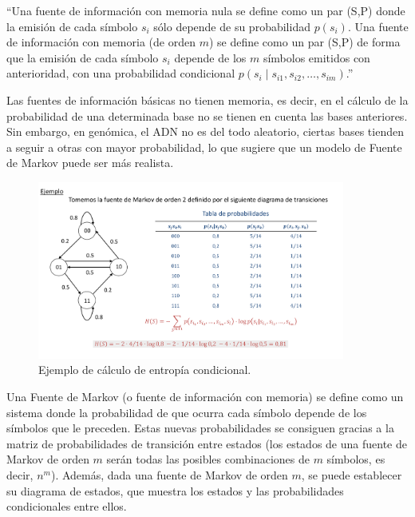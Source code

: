 \documentclass[11pt,spanish,listoffigures,listoftables]{tfgetsinf}
\begin{document}
“Una fuente de información con memoria nula se define como un par (S,P) donde la emisión de cada símbolo \( s_i \) sólo depende de su probabilidad \( p(s_i) \). Una fuente de información con memoria (de orden \( m \)) se define como un par (S,P) de forma que la emisión de cada símbolo \( s_i \) depende de los \( m \) símbolos emitidos con anterioridad, con una probabilidad condicional \( p(s_i \mid s_{i1}, s_{i2}, \dots, s_{im}) \).”\cite{fuentesupv}

Las fuentes de información básicas no tienen memoria, es decir, en el cálculo de la probabilidad de una determinada base no se tienen en cuenta las bases anteriores. Sin embargo, en genómica, el ADN no es del todo aleatorio, ciertas bases tienden a seguir a otras con mayor probabilidad, lo que sugiere que un modelo de Fuente de Markov puede ser más realista. 

\begin{figure}[H]
   \centering
   \includegraphics[width=0.9\textwidth]{entropia_markov.png}
   \caption{Ejemplo de cálculo de entropía condicional.}
   \label{fig:etiqueta_opcional}
\end{figure}


Una Fuente de Markov (o fuente de información con memoria) se define como un sistema donde la probabilidad de que ocurra cada símbolo depende de los símbolos que le preceden. Estas nuevas probabilidades se consiguen gracias a la matriz de probabilidades de transición entre estados (los estados de una fuente de Markov de orden \( m \) serán todas las posibles combinaciones de \( m \) símbolos, es decir, \( n^m \)). Además, dada una fuente de Markov de orden \( m \), se puede establecer su diagrama de estados, que muestra los estados y las probabilidades condicionales entre ellos\cite[p.~20]{ROB}.
\end{document}

